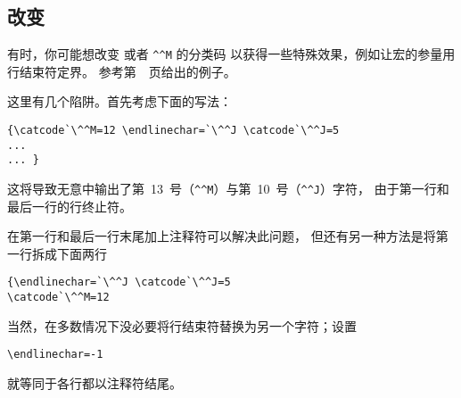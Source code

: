 \documentclass{book}
\begin{document}
\subsection{改变 }

有时，你可能想改变  或者 \verb.^^M. 的分类码%
以获得一些特殊效果，例如让宏的参量用行结束符定界。
参考第~\pageref{pick:eol}~页给出的例子。

这里有几个陷阱。首先考虑下面的写法：
\begin{verbatim}
{\catcode`\^^M=12 \endlinechar=`\^^J \catcode`\^^J=5
...
... }
\end{verbatim}
这将导致无意中输出了第~13~号（\verb-^^M-）与第~10~号（\verb-^^J-）字符，
由于第一行和最后一行的行终止符。

在第一行和最后一行末尾加上注释符可以解决此问题，
但还有另一种方法是将第一行拆成下面两行
\begin{verbatim}
{\endlinechar=`\^^J \catcode`\^^J=5
\catcode`\^^M=12
\end{verbatim}

当然，在多数情况下没必要将行结束符替换为另一个字符；设置
\begin{verbatim}
\endlinechar=-1
\end{verbatim}
就等同于各行都以注释符结尾。
\end{document}
